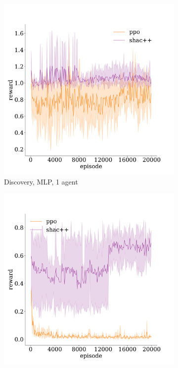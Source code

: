 \begin{figure}[t]
    \begin{subfigure}[b]{0.32\textwidth}
        \includegraphics[width=\textwidth]{figs/discovery-1-mlp.pdf}
        \caption{Discovery, MLP, 1 agent}
        \label{apx:fig:discovery-mlp-1}
    \end{subfigure}
    \begin{subfigure}[b]{0.32\textwidth}
        \includegraphics[width=\textwidth]{figs/discovery-3-mlp.pdf}

\end{subfigure}
\end{figure}
